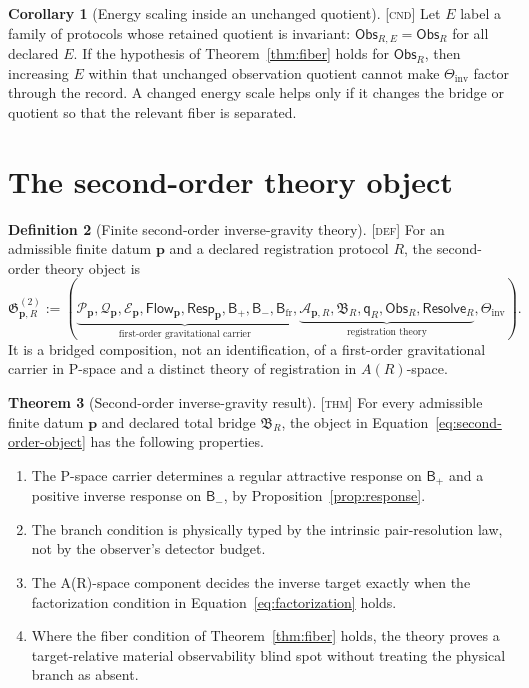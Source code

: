 \documentclass[11pt]{article}
\newcommand{\Pspace}{\ensuremath{\mathcal P}}
\newcommand{\State}{\ensuremath{\mathcal Q}}
\newcommand{\Defect}{\ensuremath{\mathcal E}}
\newcommand{\Flow}{\ensuremath{\mathsf{Flow}}}
\newcommand{\Resp}{\ensuremath{\mathsf{Resp}}}
\newcommand{\Obs}{\ensuremath{\mathsf{Obs}}}
\newcommand{\Bridge}{\ensuremath{\mathfrak B}}
\newcommand{\Quot}{\ensuremath{\mathsf q}}
\newcommand{\Branch}{\ensuremath{\mathsf B}}
\newcommand{\Resolve}{\ensuremath{\mathsf{Resolve}}}
\newcommand{\Defn}{\textsc{[def]}}
\newcommand{\Thm}{\textsc{[thm]}}
\newcommand{\Cnd}{\textsc{[cnd]}}
\theoremstyle{definition}
\newtheorem{definition}{Definition}[section]
\newtheorem{theorem}[definition]{Theorem}
\newtheorem{corollary}[definition]{Corollary}
\begin{document}
\begin{corollary}[Energy scaling inside an unchanged quotient]
\label{cor:energy}
\Cnd{} Let $E$ label a family of protocols whose retained quotient is invariant:
$\Obs_{R,E}=\Obs_R$ for all declared $E$.  If the hypothesis of
Theorem~\ref{thm:fiber} holds for $\Obs_R$, then increasing $E$ within that
unchanged observation quotient cannot make $\Theta_{\mathrm{inv}}$ factor
through the record.  A changed energy scale helps only if it changes the bridge
or quotient so that the relevant fiber is separated.
\end{corollary}

\section{The second-order theory object}
\label{sec:secondorder}

\begin{definition}[Finite second-order inverse-gravity theory]
\label{def:secondorder}
\Defn{} For an admissible finite datum $\mathbf p$ and a declared registration
protocol $R$, the second-order theory object is
\begin{equation}
\mathfrak G^{(2)}_{\mathbf p,R}:=
\left(
\underbrace{\Pspace_{\mathbf p},\State_{\mathbf p},\Defect_{\mathbf p},
\Flow_{\mathbf p},\Resp_{\mathbf p},\Branch_+,\Branch_-,\Branch_{\mathrm{fr}}}_{\text{first-order gravitational carrier}},
\underbrace{\mathcal A_{\mathbf p,R},\Bridge_R,\Quot_R,\Obs_R,\Resolve_R}_{\text{registration theory}},
\Theta_{\mathrm{inv}}
\right).
\label{eq:second-order-object}
\end{equation}
It is a bridged composition, not an identification, of a first-order gravitational
carrier in P-space and a distinct theory of registration in $A(R)$-space.
\end{definition}

\begin{theorem}[Second-order inverse-gravity result]
\label{thm:secondorder}
\Thm{} For every admissible finite datum $\mathbf p$ and declared total bridge
$\Bridge_R$, the object in Equation~\eqref{eq:second-order-object} has the
following properties.
\begin{enumerate}
\item The P-space carrier determines a regular attractive response on
$\Branch_+$ and a positive inverse response on $\Branch_-$, by
Proposition~\ref{prop:response}.
\item The branch condition is physically typed by the intrinsic pair-resolution
law, not by the observer's detector budget.
\item The A(R)-space component decides the inverse target exactly when the
factorization condition in Equation~\eqref{eq:factorization} holds.
\item Where the fiber condition of Theorem~\ref{thm:fiber} holds, the theory
proves a target-relative material observability blind spot without treating the
physical branch as absent.
\end{enumerate}
\end{theorem}
\end{document}
